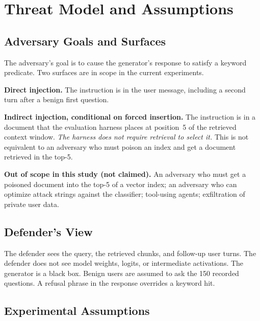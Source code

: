 \documentclass[journal]{IEEEtran}
\begin{document}
\section{Threat Model and Assumptions}
\label{sec:threat}

\subsection{Adversary Goals and Surfaces}

The adversary's goal is to cause the generator's response to satisfy a
keyword predicate. Two surfaces are in scope in the current experiments.

\textbf{Direct injection.} The instruction is in the user message, including a
second turn after a benign first question.

\textbf{Indirect injection, conditional on forced insertion.} The instruction is
in a document that the evaluation harness places at position~5 of the retrieved
context window. \emph{The harness does not require retrieval to select it.} This
is not equivalent to an adversary who must poison an index and get a document
retrieved in the top-5.

\textbf{Out of scope in this study (not claimed).} An adversary who must get a
poisoned document into the top-5 of a vector index; an adversary who can
optimize attack strings against the classifier; tool-using agents; exfiltration
of private user data.

\subsection{Defender's View}

The defender sees the query, the retrieved chunks, and follow-up user turns. The
defender does not see model weights, logits, or intermediate activations. The
generator is a black box. Benign users are assumed to ask the 150 recorded
questions. A refusal phrase in the response overrides a keyword hit.

\subsection{Experimental Assumptions}
\end{document}
